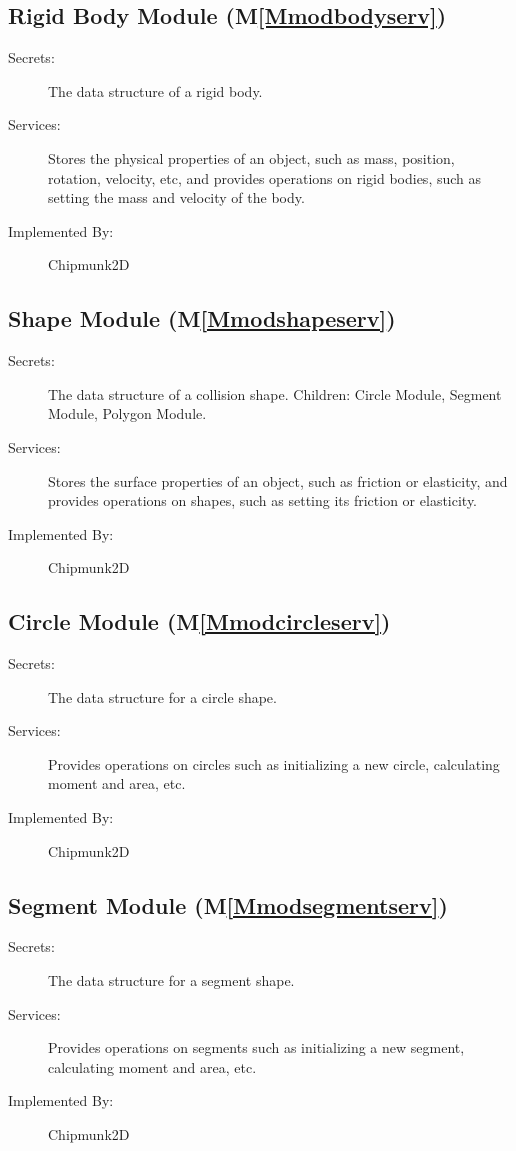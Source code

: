\documentclass[12pt]{article}
\begin{document}
\subsection{Rigid Body Module (M\ref{Mmodbodyserv})}
\label{Sec:RigiBodyModu()}
\begin{description}
\item[Secrets:]The data structure of a rigid body.
\item[Services:]Stores the physical properties of an object, such as mass, position, rotation, velocity, etc, and provides operations on rigid bodies, such as setting the mass and velocity of the body.
\item[Implemented By:]Chipmunk2D
\end{description}
\subsection{Shape Module (M\ref{Mmodshapeserv})}
\label{Sec:ShapModu()}
\begin{description}
\item[Secrets:]The data structure of a collision shape. Children: Circle Module, Segment Module, Polygon Module.
\item[Services:]Stores the surface properties of an object, such as friction or elasticity, and provides operations on shapes, such as setting its friction or elasticity.
\item[Implemented By:]Chipmunk2D
\end{description}
\subsection{Circle Module (M\ref{Mmodcircleserv})}
\label{Sec:CircModu()}
\begin{description}
\item[Secrets:]The data structure for a circle shape.
\item[Services:]Provides operations on circles such as initializing a new circle, calculating moment and area, etc.
\item[Implemented By:]Chipmunk2D
\end{description}
\subsection{Segment Module (M\ref{Mmodsegmentserv})}
\label{Sec:SegmModu()}
\begin{description}
\item[Secrets:]The data structure for a segment shape.
\item[Services:]Provides operations on segments such as initializing a new segment, calculating moment and area, etc.
\item[Implemented By:]Chipmunk2D
\end{description}
\end{document}
